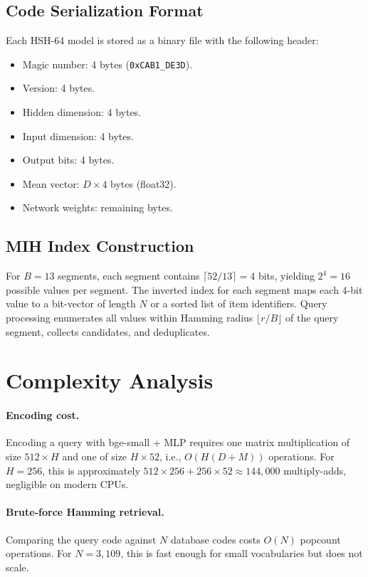 \documentclass[11pt,a4paper]{article}
\begin{document}
\subsection{Code Serialization Format}
Each HSH-64 model is stored as a binary file with the following header:
\begin{itemize}[leftmargin=*]
    \item Magic number: 4 bytes (\texttt{0xCAB1\_DE3D}).
    \item Version: 4 bytes.
    \item Hidden dimension: 4 bytes.
    \item Input dimension: 4 bytes.
    \item Output bits: 4 bytes.
    \item Mean vector: $D \times 4$ bytes (float32).
    \item Network weights: remaining bytes.
\end{itemize}

\subsection{MIH Index Construction}
For $B=13$ segments, each segment contains $\lceil 52/13 \rceil = 4$ bits, yielding $2^4=16$ possible values per segment. The inverted index for each segment maps each 4-bit value to a bit-vector of length $N$ or a sorted list of item identifiers. Query processing enumerates all values within Hamming radius $\lfloor r/B \rfloor$ of the query segment, collects candidates, and deduplicates.

\section{Complexity Analysis}

\paragraph{Encoding cost.} Encoding a query with bge-small + MLP requires one matrix multiplication of size $512 \times H$ and one of size $H \times 52$, i.e., $O(H(D+M))$ operations. For $H=256$, this is approximately $512 \times 256 + 256 \times 52 \approx 144{,}000$ multiply-adds, negligible on modern CPUs.

\paragraph{Brute-force Hamming retrieval.} Comparing the query code against $N$ database codes costs $O(N)$ popcount operations. For $N=3{,}109$, this is fast enough for small vocabularies but does not scale.
\end{document}
